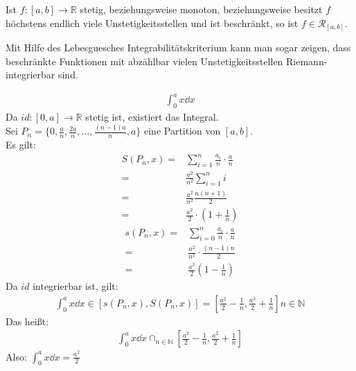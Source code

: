 
\begin{Korollar}{
	Ist $f:[a,b] \rightarrow \mathbb{R}$ stetig, beziehungsweise monoton, beziehungsweise 
	besitzt $f$ höchstens endlich viele Unstetigkeitsstellen und ist beschränkt, so ist 
	$f \in \mathcal{R}_{[a,b]}$.
}\end{Korollar}

\begin{Bemerkung}{
	Mit Hilfe des Lebesguesches Integrabilitätskriterium kann man 
	sogar zeigen, dass beschränkte Funktionen mit abzählbar vielen Unstetigkeitsstellen 
	Riemann-integrierbar sind.
}\end{Bemerkung}

\begin{Beispiel}{
	\begin{align*}
		\int_0^a x \dd{x}
	\end{align*}
	Da $id :[0,a] \rightarrow \mathbb{R}$ stetig ist, existiert das Integral. \\
	Sei $P_n =\{ 0, \frac{a}{n}, \frac{2a}{n}, \hdots, \frac{(n-1)a}{n}, a\}$ 
	eine Partition von $[a,b]$. \\
	Es gilt: 
	\begin{align*}
		S(P_n, x) = & \sum_{i =1} ^n \frac{a_i}{n} \cdot \frac{a}{n} \\
		= & \frac{a^2}{n^2} \sum_{i = 1}^n i \\
		= & \frac{a^2}{n^2} \frac{n(n+1)}{2} \\ 
		= & \frac{a^2}{2} \cdot \left( 1 + \frac{1}{n} \right)
	\end{align*}
	\begin{align*}
		s(P_n, x) = & \sum_{i = 0}^n \frac{a_i}{n} \cdot \frac{a}{n}  \\
		= & \frac{a^2}{n^2} \cdot \frac{(n-1)n}{2} \\
		= & \frac{a^2}{2}\left( 1 - \frac{1}{n} \right)
	\end{align*}
	Da $id$ integrierbar ist, gilt:
	\begin{align*}
		\int_0^a x \dd{x} \in \left[ s(P_n,x), S(P_n, x)\right] = 
		\left[\frac{a^2}{2}- \frac{1}{n}, \frac{a^2}{2}+\frac{1}{n}\right]
		n \in \mathbb{N}
	\end{align*}
	Das heißt:
	\begin{align*}
		\int_0^a x \dd{x} \cap_{n \in \mathbb{N}} \left[\frac{a^2}{2}- \frac{1}{n}, 
		\frac{a^2}{2}+\frac{1}{n}\right]
	\end{align*}
	Also: $\int_0^a x \dd{x} = \frac{a^2}{2}$
}\end{Beispiel}

